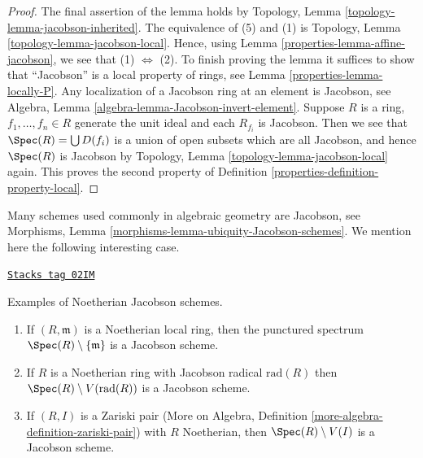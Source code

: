\begin{proof}

The final assertion of the lemma holds by
Topology, Lemma \ref{topology-lemma-jacobson-inherited}.
The equivalence of (5) and (1) is
Topology, Lemma \ref{topology-lemma-jacobson-local}.
Hence, using Lemma \ref{properties-lemma-affine-jacobson},
we see that (1) $\Leftrightarrow$ (2).
To finish proving the lemma it suffices to show that ``Jacobson''
is a local property of rings, see Lemma \ref{properties-lemma-locally-P}.
Any localization of a Jacobson ring at an element is Jacobson, see
Algebra, Lemma \ref{algebra-lemma-Jacobson-invert-element}.
Suppose $R$ is a ring, $f_1, \ldots, f_n \in R$ generate the unit
ideal and each $R_{f_i}$ is Jacobson. Then we see that
$\Spec(R) = \bigcup D(f_i)$ is a union of open subsets
which are all Jacobson, and hence $\Spec(R)$ is Jacobson
by Topology, Lemma \ref{topology-lemma-jacobson-local} again.
This proves the second property of Definition \ref{properties-definition-property-local}.
\end{proof}

Many schemes used commonly in algebraic geometry are Jacobson, see
Morphisms, Lemma \ref{morphisms-lemma-ubiquity-Jacobson-schemes}.
We mention here the following interesting case.

\begin{lemma}
\label{properties-lemma-complement-closed-point-Jacobson}
\href{https://stacks.math.columbia.edu/tag/02IM}{\texttt{Stacks tag 02IM}}

Examples of Noetherian Jacobson schemes.
\begin{enumerate}
\item If $(R, \mathfrak m)$ is a Noetherian local ring, then
the punctured spectrum $\Spec(R) \setminus \{\mathfrak m\}$
is a Jacobson scheme.
\item If $R$ is a Noetherian ring with Jacobson radical $\text{rad}(R)$
then $\Spec(R) \setminus V(\text{rad}(R))$ is a Jacobson scheme.
\item If $(R, I)$ is a Zariski pair (More on Algebra, Definition
\ref{more-algebra-definition-zariski-pair})
with $R$ Noetherian, then $\Spec(R) \setminus V(I)$ is a
Jacobson scheme.
\end{enumerate}
\end{lemma}

